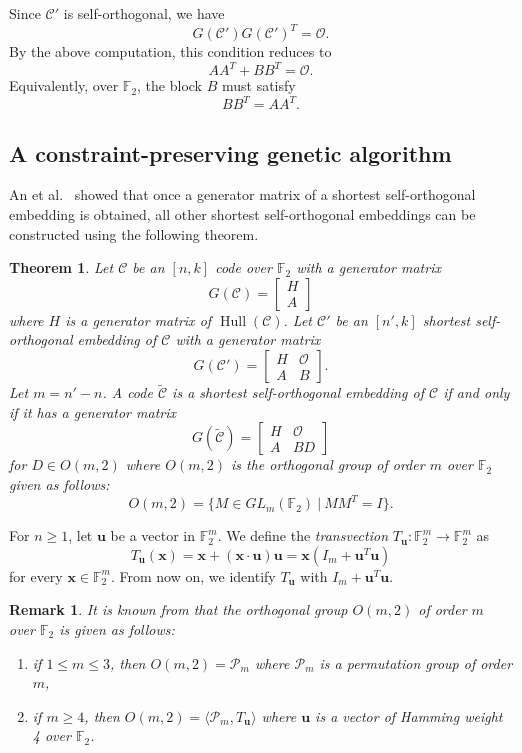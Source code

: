 \documentclass{article}
\newtheorem{theorem}{Theorem}
\newtheorem{remark}{Remark}
\newcommand{\Hull}{\operatorname{Hull}}
\begin{document}
Since $\mathcal{C}'$ is self-orthogonal, we have
\[
G(\mathcal{C}')G(\mathcal{C}')^T=\mathcal{O}.
\]
By the above computation, this condition reduces to
\[
AA^T+BB^T=\mathcal{O}.
\]
Equivalently, over $\mathbb{F}_2$, the block $B$ must satisfy
\[
BB^T=AA^T.
\]
\subsection{A constraint-preserving genetic algorithm}\label{so-embedding-algorithm}
An et al.~\cite{akklw-2025} showed that once a generator matrix of a shortest self-orthogonal embedding is obtained, all other shortest self-orthogonal embeddings can be constructed using the following theorem.
\begin{theorem}\cite{akklw-2025}\label{orthogonal-matrix}
    Let $\mathcal{C}$ be an $[n,k]$ code over $\mathbb{F}_2$ with a generator matrix \[
    G(\mathcal{C}) = \begin{bmatrix}
        H \\ A
    \end{bmatrix}
    \] where $H$ is a generator matrix of $\Hull(\mathcal{C})$.
    Let $\mathcal{C}'$ be an $[n', k]$ shortest self-orthogonal embedding of $\mathcal{C}$ with a generator matrix\[
    G(\mathcal{C}')=\begin{bmatrix}
        H & \mathcal{O}\\
        A & B
        \end{bmatrix}.
    \]
    Let $m=n'-n$. A code $\tilde{\mathcal{C}}$ is a shortest self-orthogonal embedding of $\mathcal{C}$ if and only if it has a generator matrix \[
    G(\tilde{\mathcal{C}}) = \begin{bmatrix}
    H & \mathcal{O}\\
    A & BD
    \end{bmatrix}
\] for $D \in O(m,2)$ where $O(m,2)$ is the orthogonal group of order $m$ over $\mathbb{F}_2$ given as follows:
\[
O(m,2) = \{M \in GL_m(\mathbb{F}_2)~|~MM^T=I \}.
\]
\end{theorem}
For $n \geq 1$, let $\mathbf{u}$ be a vector in $\mathbb{F}_2^m$. We define the \textit{transvection} $T_\mathbf{u}:\mathbb{F}_2^m \to \mathbb{F}_2^m$ as \[
T_\mathbf{u}(\mathbf{x})=\mathbf{x}+(\mathbf{x} \cdot \mathbf{u})\mathbf{u}=\mathbf{x}(I_m+\mathbf{u}^T\mathbf{u})
\] for every $\mathbf{x} \in \mathbb{F}_2^m$. From now on, we identify $T_\mathbf{u}$ with $I_m+\mathbf{u}^T\mathbf{u}$.
\begin{remark}\label{orthogonal-group}
    It is known from \cite{Parametrization} that the orthogonal group $O(m,2)$ of order $m$ over $\mathbb{F}_2$ is given as follows:
    \begin{enumerate}
    \item if $1 \leq m \leq 3$, then $O(m,2) = \mathcal{P}_m$ where $\mathcal{P}_m$ is a permutation group of order $m$,
    \item if $m \geq 4$, then $O(m,2)=\langle\mathcal{P}_m, T_{\mathbf{u}}\rangle$
    where $\mathbf{u}$ is a vector of Hamming weight 4 over $\mathbb{F}_2$.
    \end{enumerate}
\end{remark}
\end{document}
